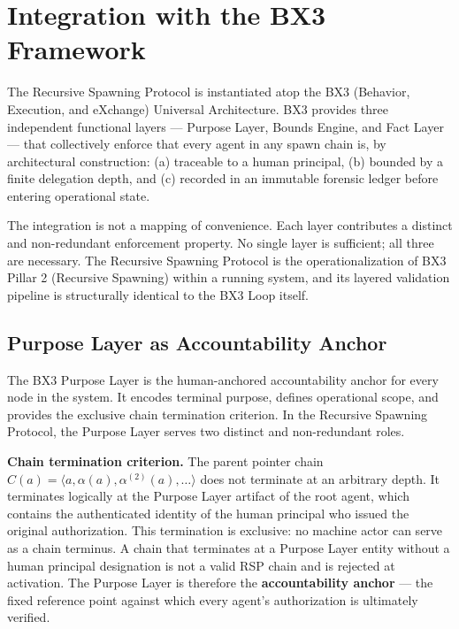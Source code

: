 
\section{Integration with the BX3 Framework}
\label{sec:bx3-integration}

The Recursive Spawning Protocol is instantiated atop the BX3 (Behavior, Execution, and eXchange) Universal Architecture. BX3 provides three independent functional layers — Purpose Layer, Bounds Engine, and Fact Layer — that collectively enforce that every agent in any spawn chain is, by architectural construction: (a) traceable to a human principal, (b) bounded by a finite delegation depth, and (c) recorded in an immutable forensic ledger before entering operational state.

The integration is not a mapping of convenience. Each layer contributes a distinct and non-redundant enforcement property. No single layer is sufficient; all three are necessary. The Recursive Spawning Protocol is the operationalization of BX3 Pillar 2 (Recursive Spawning) within a running system, and its layered validation pipeline is structurally identical to the BX3 Loop itself.

\subsection{Purpose Layer as Accountability Anchor}

The BX3 Purpose Layer is the human-anchored accountability anchor for every node in the system. It encodes terminal purpose, defines operational scope, and provides the exclusive chain termination criterion. In the Recursive Spawning Protocol, the Purpose Layer serves two distinct and non-redundant roles.

\textbf{Chain termination criterion.} The parent pointer chain $C(a) = \langle a, \alpha(a), \alpha^{(2)}(a), \ldots \rangle$ does not terminate at an arbitrary depth. It terminates logically at the Purpose Layer artifact of the root agent, which contains the authenticated identity of the human principal who issued the original authorization. This termination is exclusive: no machine actor can serve as a chain terminus. A chain that terminates at a Purpose Layer entity without a human principal designation is not a valid RSP chain and is rejected at activation. The Purpose Layer is therefore the \textbf{accountability anchor} — the fixed reference point against which every agent's authorization is ultimately verified.

